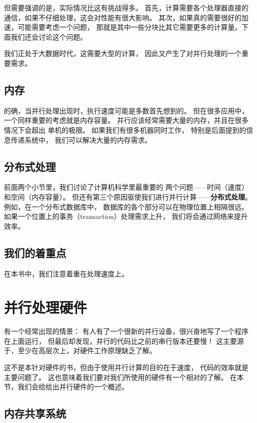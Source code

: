 但需要强调的是，实际情况比这有挑战得多。
首先，计算需要各个处理器直接的通信，如果不仔细处理，这会对性能有很大影响。
其次，如果真的需要很好的加速，可能需要考虑一个问题，
那就是其中一些分块比其它需要更多的计算量。下面我们还会讨论这个问题。

我们正处于大数据时代，这需要大型的计算，
因此又产生了对并行处理的一个重要需求。


\subsection{内存}

的确，当并行处理出现时，执行速度可能是多数首先想到的。
但在很多应用中，一个同样重要的考虑就是内存容量。
并行应该经常需要大量的内存，并且在很多情况下会超出
单机的极限。
如果我们有很多机器同时工作，
特别是后面提到的信息传递系统中，
我们可以解决大量的内存需求。

\subsection{分布式处理}

前面两个小节里，我们讨论了计算机科学里最重要的
两个问题——时间（速度）和空间（内存容量）。
但还有第三个原因驱使我们进行并行计算——{\bf 分布式处理}。
例如，在一个分布式数据库中，
数据库的各个部分可以在物理位置上相隔很远。
如果一个位置上的事务（transaction）处理需求上升，
我们将会通过网络来提升效率。

\subsection{我们的着重点}

在本书中，我们注意着重在处理速度上。


\section{并行处理硬件}

有一个经常出现的情景：
有人有了一个很新的并行设备，很兴奋地写了一个程序在上面运行，
但最后却发现，并行的代码比之前的串行版本还要慢！
这主要源于，至少在高层次上，对硬件工作原理缺乏了解。

这不是本针对硬件的书，但由于使用并行计算的目的在于速度，
代码的效率就是主要问题了。
这也意味着我们要对我们所使用的硬件有一个相对的了解。
在本节，我们会给给出并行硬件的一个概述。

\subsection{内存共享系统}

